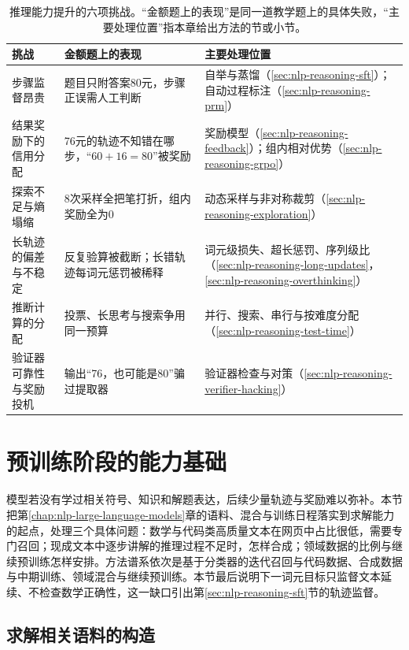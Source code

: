 \begin{table}[htbp]
  \centering
  \small
  \caption{推理能力提升的六项挑战。“金额题上的表现”是同一道教学题上的具体失败，“主要处理位置”指本章给出方法的节或小节。}
  \label{tab:nlp-reasoning-challenges}
  \begin{tabularx}{\linewidth}{@{}p{30mm}Xp{42mm}@{}}
    \toprule
    挑战 & 金额题上的表现 & 主要处理位置\\
    \midrule
    步骤监督昂贵 & 题目只附答案80元，步骤正误需人工判断 & 自举与蒸馏（\ref{sec:nlp-reasoning-sft}）；自动过程标注（\ref{sec:nlp-reasoning-prm}）\\
    结果奖励下的信用分配 & 76元的轨迹不知错在哪步，“$60+16=80$”被奖励 & 奖励模型（\ref{sec:nlp-reasoning-feedback}）；组内相对优势（\ref{sec:nlp-reasoning-grpo}）\\
    探索不足与熵塌缩 & 8次采样全把笔打折，组内奖励全为0 & 动态采样与非对称裁剪（\ref{sec:nlp-reasoning-exploration}）\\
    长轨迹的偏差与不稳定 & 反复验算被截断；长错轨迹每词元惩罚被稀释 & 词元级损失、超长惩罚、序列级比（\ref{sec:nlp-reasoning-long-updates}，\ref{sec:nlp-reasoning-overthinking}）\\
    推断计算的分配 & 投票、长思考与搜索争用同一预算 & 并行、搜索、串行与按难度分配（\ref{sec:nlp-reasoning-test-time}）\\
    验证器可靠性与奖励投机 & 输出“76，也可能是80”骗过提取器 & 验证器检查与对策（\ref{sec:nlp-reasoning-verifier-hacking}）\\
    \bottomrule
  \end{tabularx}
\end{table}

\section{预训练阶段的能力基础}
\label{sec:nlp-reasoning-pretraining}

模型若没有学过相关符号、知识和解题表达，后续少量轨迹与奖励难以弥补。本节把第\ref{chap:nlp-large-language-models}章的语料、混合与训练日程落实到求解能力的起点，处理三个具体问题：数学与代码类高质量文本在网页中占比很低，需要专门召回；现成文本中逐步讲解的推理过程不足时，怎样合成；领域数据的比例与继续预训练怎样安排。方法谱系依次是基于分类器的迭代召回与代码数据、合成数据与中期训练、领域混合与继续预训练。本节最后说明下一词元目标只监督文本延续、不检查数学正确性，这一缺口引出第\ref{sec:nlp-reasoning-sft}节的轨迹监督。

\subsection{求解相关语料的构造}
\label{sec:nlp-reasoning-corpora}

